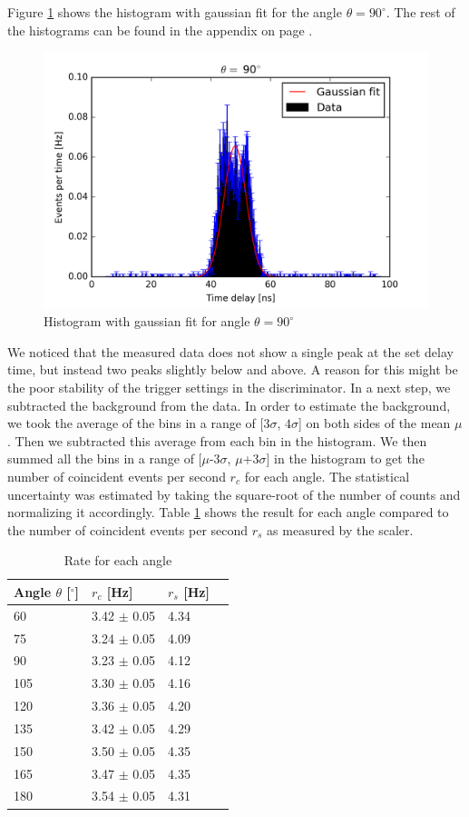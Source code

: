 \documentclass[a4paper,parskip,11pt, DIV12]{scrreprt}
\begin{document}
Figure \ref{fig:hist120} shows the histogram with gaussian fit for the angle $\theta = 90^{\circ}$. The rest of the histograms can be found in the appendix on page \pageref{app:histogram}.
%
\begin{figure}[H]
\centering
\includegraphics[scale=0.65]{90deg.png}
\caption[Histogram]{Histogram with gaussian fit for angle $\theta = 90^{\circ}$}
\label{fig:hist120}
\end{figure}
%
We noticed that the measured data does not show a single peak at the set delay time, but instead two peaks slightly below and above. A reason for this might be the poor stability of the trigger settings in the discriminator. In a next step, we subtracted the background from the data. In order to estimate the background, we took the average of the bins in a range of [$3\sigma$, $4\sigma$] on both sides of the mean $\mu$. Then we subtracted this average from each bin in the histogram. We then summed all the bins in a range of [$\mu$-3$\sigma$, $\mu$+3$\sigma$] in the histogram to get the number of coincident events per second $r_c$ for each angle. The statistical uncertainty was estimated by taking the square-root of the number of counts and normalizing it accordingly. Table \ref{tab:nevents} shows the result for each angle compared to the number of coincident events per second $r_{s}$ as measured by the scaler.
%
\begin{table}[H]
\begin{center}
\begin{tabular}{llll}
Angle $\theta$ [$^{\circ}$] & $r_{c}$ [Hz] & $r_{s}$ [Hz]\\
\hline
60 	& 3.42 $\pm$ 0.05 & 4.34\\
  75 	& 3.24 $\pm$ 0.05 & 4.09\\
  90 	& 3.23 $\pm$ 0.05 & 4.12\\
105 	& 3.30 $\pm$ 0.05 & 4.16\\
120	& 3.36 $\pm$ 0.05 & 4.20\\
135	& 3.42 $\pm$ 0.05 & 4.29\\
150	& 3.50 $\pm$ 0.05 & 4.35\\
165	& 3.47 $\pm$ 0.05 & 4.35\\
180	& 3.54 $\pm$ 0.05 & 4.31\\ 
\end{tabular}
\caption{Rate for each angle}
\label{tab:nevents}
\end{center}
\end{table}
%
\end{document}
